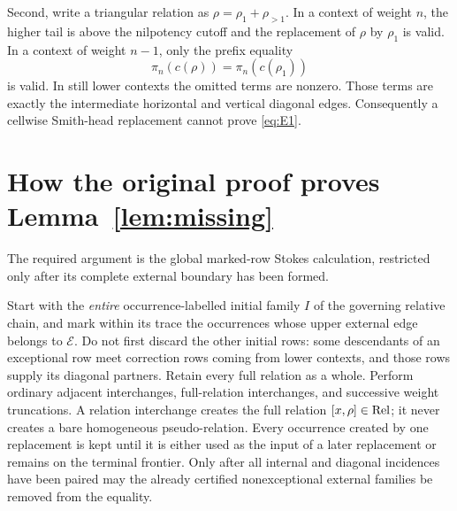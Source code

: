 \documentclass[11pt]{article}
\newcommand{\Rel}{\mathop{\rm Rel}}
\begin{document}
Second, write a triangular relation as
\(\rho=\rho_1+\rho_{>1}\).  In a context of weight \(n\), the higher tail is
above the nilpotency cutoff and the replacement of \(\rho\) by \(\rho_1\) is
valid.  In a context of weight \(n-1\), only the prefix equality
\[
 \pi_n(c(\rho))=\pi_n(c(\rho_1))
\]
is valid.  In still lower contexts the omitted terms are nonzero.  Those
terms are exactly the intermediate horizontal and vertical diagonal edges.
Consequently a cellwise Smith-head replacement cannot prove
\eqref{eq:E1}.

\section{How the original proof proves Lemma~\ref{lem:missing}}

The required argument is the global marked-row Stokes calculation, restricted
only after its complete external boundary has been formed.

Start with the \emph{entire} occurrence-labelled initial family $I$ of the
governing relative chain, and mark within its trace the occurrences whose
upper external edge belongs to $\mathcal E$.  Do not first discard the other
initial rows: some descendants of an exceptional row meet correction rows
coming from lower contexts, and those rows supply its diagonal partners.
Retain every full relation as a whole.  Perform ordinary adjacent
interchanges, full-relation interchanges, and successive weight truncations.
A relation interchange creates the full relation $[x,\rho]\in\Rel$; it never
creates a bare homogeneous pseudo-relation.  Every occurrence created by one
replacement is kept until it is either used as the input of a later
replacement or remains on the terminal frontier.  Only after all internal
and diagonal incidences have been paired may the already certified
nonexceptional external families be removed from the equality.
\end{document}
